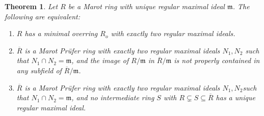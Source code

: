 \documentclass[12pt]{article}
\newtheorem{theorem}{Theorem}
\begin{document}
	\begin{theorem}\label{minimal-two-characterization}
		Let $R$ be a Marot ring with unique regular maximal ideal $\mathfrak{m}$. The following are equivalent:
		\begin{enumerate}[label=(\roman*)]
			\item $R$ has a minimal overring $R_o$ with exactly two regular maximal ideals.
			\item $\overline R$ is a Marot Prüfer ring with exactly two regular maximal ideals $N_1,N_2$ such that $N_1\cap N_2=\mathfrak{m}$, and the image of $R/\mathfrak{m}$ in $\overline R/\mathfrak{m}$ is not properly contained in any subfield of $\overline R/\mathfrak{m}$.
			\item $\overline R$ is a Marot Prüfer ring with exactly two regular maximal ideals $N_1,N_2$such that $N_1\cap N_2=\mathfrak{m}$, and no intermediate ring $S$ with $R\subsetneq S\subseteq\overline R$ has a unique regular maximal ideal.
		\end{enumerate}
	\end{theorem}
\end{document}
